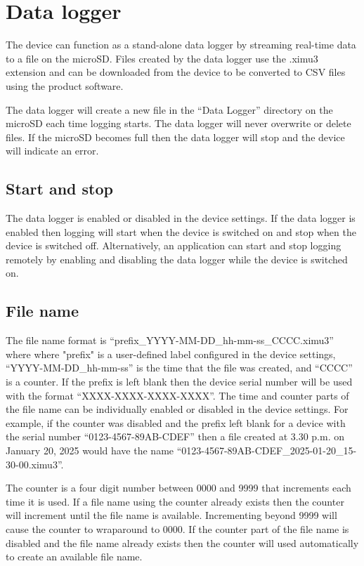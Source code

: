 \section{Data logger}
\label{sec:dataLogger}

The device can function as a stand-alone data logger by streaming real-time data to a file on the \ac{microSD}.  Files created by the data logger use the .ximu3 extension and can be downloaded from the device to be converted to \ac{CSV} files using the product software.

The data logger will create a new file in the \enquote{Data Logger} directory on the \ac{microSD} each time logging starts.  The data logger will never overwrite or delete files.  If the \ac{microSD} becomes full then the data logger will stop and the device will indicate an error.

\subsection{Start and stop}

The data logger is enabled or disabled in the device settings.  If the data logger is enabled then logging will start when the device is switched on and stop when the device is switched off.  Alternatively, an application can start and stop logging remotely by enabling and disabling the data logger while the device is switched on.

\subsection{File name}
\label{sec:fileName}

The file name format is \enquote{prefix\_YYYY-MM-DD\_hh-mm-ss\_CCCC.ximu3} where where "prefix" is a user-defined label configured in the device settings, \enquote{YYYY-MM-DD\_hh-mm-ss} is the time that the file was created, and \enquote{CCCC} is a counter.  If the prefix is left blank then the device serial number will be used with the format \enquote{XXXX-XXXX-XXXX-XXXX}.  The time and counter parts of the file name can be individually enabled or disabled in the device settings.  For example, if the counter was disabled and the prefix left blank for a device with the serial number \enquote{0123-4567-89AB-CDEF} then a file created at 3.30 p.m. on January 20, 2025 would have the name \enquote{0123-4567-89AB-CDEF\_2025-01-20\_15-30-00.ximu3}.

The counter is a four digit number between 0000 and 9999 that increments each time it is used.  If a file name using the counter already exists then the counter will increment until the file name is available.  Incrementing beyond 9999 will cause the counter to wraparound to 0000.  If the counter part of the file name is disabled and the file name already exists then the counter will used automatically to create an available file name.

